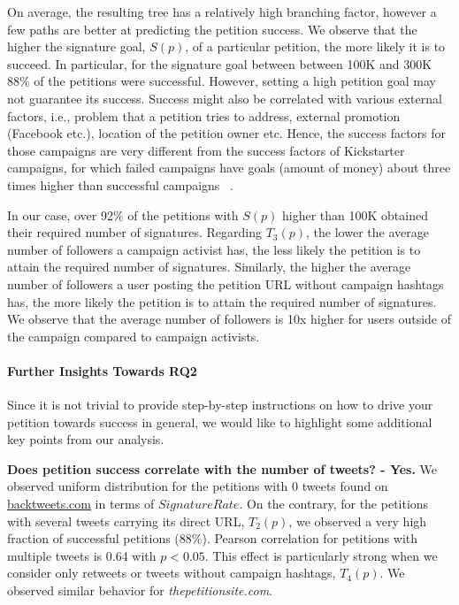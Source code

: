 On average, the resulting tree has a relatively high branching factor, however a few paths are better at predicting the petition success.
We observe that the higher the signature goal, $S(p)$, of a particular petition, the more likely it is to succeed.
In particular, for the signature goal between between 100K and 300K 88\% of the petitions were successful.
However, setting a high petition goal may not guarantee its success. Success might also be correlated with various external factors, i.e., problem that a petition tries to address, external promotion (Facebook etc.), location of the petition owner etc.
Hence, the success factors for those campaigns are very different from the success factors of Kickstarter campaigns, for which failed campaigns have goals (amount of money) about three times higher than successful campaigns~\citeauthor{Etter2013} .

In our case, over 92\% of the petitions with $S(p)$ higher than 100K obtained their required number of signatures.
Regarding $T_3(p)$, the lower the average number of followers a campaign activist has, the less likely the petition is to attain the required number of signatures.
Similarly, the higher the average number of followers a user posting the petition URL without campaign hashtags has, the more likely the petition is to attain the required number of signatures.
We observe that the average number of followers is 10x higher for users outside of the campaign compared to campaign activists. 

\paragraph{Further Insights Towards RQ2}
Since it is not trivial to provide step-by-step instructions on how to drive your petition towards success in general, we would like to highlight some additional key points from our analysis.


\textbf{Does petition success correlate with the number of tweets? - Yes.} We observed uniform distribution for the petitions with 0 tweets found on \url{backtweets.com} in terms of $SignatureRate$. On the contrary, for the petitions with several tweets carrying its direct URL, $T_2(p)$, we observed a very high fraction of successful petitions (88\%). Pearson correlation for petitions with multiple tweets is 0.64 with \(p < 0.05\). This effect is particularly strong when we consider only retweets or tweets without campaign hashtags, $T_4(p)$. We observed similar behavior for \textit{thepetitionsite.com}.

